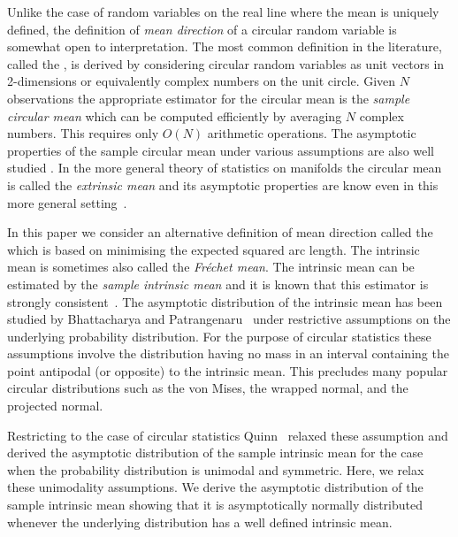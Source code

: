 \documentclass[journal]{../bib/IEEEtran}
\begin{document}
Unlike the case of random variables on the real line where the mean is uniquely defined, the definition of \emph{mean direction} of a circular random variable is somewhat open to interpretation. The most common definition in the literature, called the , is derived by considering circular random variables as unit vectors in 2-dimensions or equivalently complex numbers on the unit circle. Given $N$ observations the appropriate estimator for the circular mean is the \emph{sample circular mean} which can be computed efficiently by averaging $N$ complex numbers. This requires only $O(N)$ arithmetic operations.  The asymptotic properties of the sample circular mean under various assumptions are also well studied \cite{Mardia_directional_statistics,Quinn2009_dasp_phase_only_information_loss,Jammalamadaka_dir_stat_book,McKilliam2010thesis}.  In the more general theory of statistics on manifolds the circular mean is called the \emph{extrinsic mean} and its asymptotic properties are know even in this more general setting~\cite{Bhattacharya_int_ext_means_2003}.

In this paper we consider an alternative definition of mean direction called the  which is based on minimising the expected squared arc length. %
The intrinsic mean is sometimes also called the \emph{Fr\'{e}chet mean}.  The intrinsic mean can be estimated by the \emph{sample intrinsic mean} and it is known that this estimator is strongly consistent~\cite{Ziezold_intrinsic_mean_1977,Bhattacharya_int_ext_means_2003}.  The asymptotic distribution of the intrinsic mean has been studied by Bhattacharya and  Patrangenaru~\cite{Bhattacharya_int_ext_means_2005} under restrictive assumptions on the underlying probability distribution.  For the purpose of circular statistics these assumptions involve the distribution having no mass in an interval containing the point antipodal (or opposite) to the intrinsic mean.  This precludes many popular circular distributions such as the von Mises, the wrapped normal, and the projected normal.

Restricting to the case of circular statistics Quinn~\cite{Quinn2007} relaxed these assumption and derived the asymptotic distribution of the sample intrinsic mean for the case when the probability distribution is unimodal and symmetric.  Here, we relax these unimodality assumptions.  We derive the asymptotic distribution of the sample intrinsic mean showing that it is asymptotically normally distributed whenever the underlying distribution has a well defined intrinsic mean.
\end{document}
